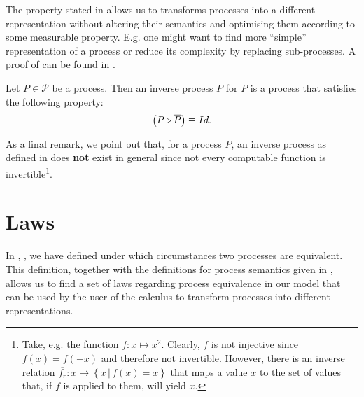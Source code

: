 The property stated in  allows us to transforms processes into a different representation without altering their semantics and optimising them according to some measurable property. E.g. one might want to find more \enquote{simple} representation of a process or reduce its complexity by replacing sub-processes. A proof of  can be found in .

\begin{definition}
\label{def:inverse_process}
Let $P \in \mathcal{P}$ be a process. Then an inverse process $\overline{P}$ for $P$ is a process that satisfies the following property:
  \begin{equation*}
    \left( P \triangleright \overline{P} \right) \equiv Id.
  \end{equation*}
  \hfill\qedsymbol
\end{definition}



As a final remark, we point out that, for a process $P$, an inverse process as defined in  does \textbf{not} exist in general since not every computable function is invertible\footnote{Take, e.g. the function $f \colon x \mapsto x^2$. Clearly, $f$ is not injective since $f \left( x \right) = f \left( -x \right)$ and therefore not invertible. However, there is an inverse relation $\overline{f_r} \colon x \mapsto \left\{ \overline{x} \,|\, f \left( \overline{x} \right) = x \right\}$ that maps a value $x$ to the set of values that, if $f$ is applied to them, will yield $x$.}.



\clearpage
\section{Laws}
\label{chp:laws}
\vspace*{-0.75em}
In , , we have defined under which circumstances two processes are equivalent. This definition, together with the definitions for process semantics given in , allows us to find a set of laws regarding process equivalence in our model that can be used by the user of the calculus to transform processes into different representations.

